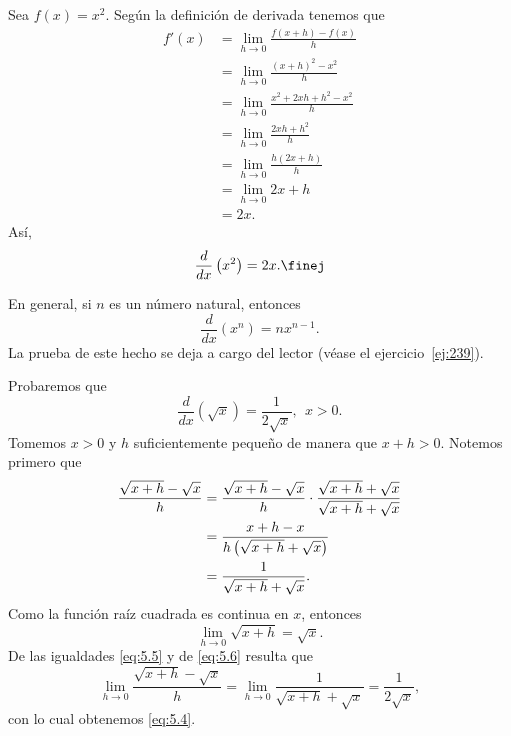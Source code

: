 \documentclass[12pt,a4paper]{book}
\begin{document}
    \begin{ejemplo}\label{ejm:74}
        Sea $f(x)=x^{2}$. Según la
        definición de derivada tenemos que
        \begin{align*}
            f'(x)&=\lim_{h\to 0}\frac{f(x+h)-f(x)}{h}\\
            &=\lim_{h\to 0}\frac{(x+h)^{2}-x^{2}}{h}\\
            &=\lim_{h\to 0}\frac{x^{2}+2xh+h^{2}-x^{2}}{h}\\
            &=\lim_{h\to 0}\frac{2xh+h^{2}}{h}\\
            &=\lim_{h\to 0}\frac{h(2x+h)}{h}\\
            &=\lim_{h\to 0}2x+h\\
            &=2x.
        \end{align*}
        Así,
        \begin{equation*}
            \frac{d}{dx}\left(x^{2}\right)=2x.\finej
        \end{equation*}
    \end{ejemplo}

    En general, si $n$ es un número natural, entonces
    \begin{equation*}
        \frac{d}{dx}(x^{n})=nx^{n-1}.
    \end{equation*}
    La prueba de este hecho se deja a cargo del lector (véase el ejercicio~\ref{ej:239}).

    \begin{ejemplo}\label{ejm:75}
        Probaremos que
        \begin{equation}\label{eq:5.4}
            \frac{d}{dx}\left(\sqrt{x}\right)=\frac{1}{2\sqrt{x}},\ \ x>0.
        \end{equation}
        Tomemos $x>0$ y $h$ suficientemente pequeño de manera que $x+h>0$.
        Notemos primero que
        \begin{align}
            \frac{\sqrt{x+h}-\sqrt{x}}{h}&=\frac{\sqrt{x+h}-\sqrt{x}}{h}\cdot\frac{\sqrt{x+h}+\sqrt{x}}{\sqrt{x+h}+\sqrt{x}}\notag\\
            &=\frac{x+h-x}{h\left(\sqrt{x+h}+\sqrt{x}\right)}\notag\\
            &=\frac{1}{\sqrt{x+h}+\sqrt{x}}.\label{eq:5.5}
        \end{align}
        Como la función raíz cuadrada es continua en $x$, entonces
        \begin{equation}\label{eq:5.6}
            \lim_{h\to 0}\sqrt{x+h}=\sqrt{x}.
        \end{equation}
        De las igualdades \eqref{eq:5.5} y de \eqref{eq:5.6} resulta que
        \begin{equation*}
            \lim_{h\to 0}\frac{\sqrt{x+h}-\sqrt{x}}{h}=\lim_{h\to 0}\frac{1}{\sqrt{x+h}+\sqrt{x}}=\frac{1}{2\sqrt{x}},
        \end{equation*}
        con lo cual obtenemos \eqref{eq:5.4}.
    \end{ejemplo}
\end{document}
